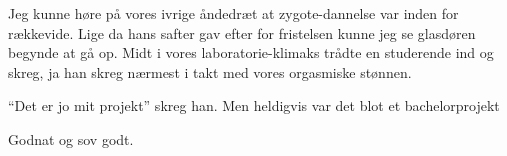 \documentclass[a4paper,11pt]{article}
\begin{document}
\begin{sketch}
Jeg kunne høre på vores ivrige åndedræt at zygote-dannelse var inden for rækkevide. Lige da hans safter  gav efter for fristelsen kunne jeg se glasdøren begynde at gå op. Midt i vores laboratorie-klimaks trådte en studerende ind og skreg, ja han skreg nærmest i takt med vores orgasmiske  stønnen.

``Det er jo mit projekt'' skreg han. Men heldigvis var det blot et bachelorprojekt

Godnat og sov godt.



\end{sketch}
\end{document}
